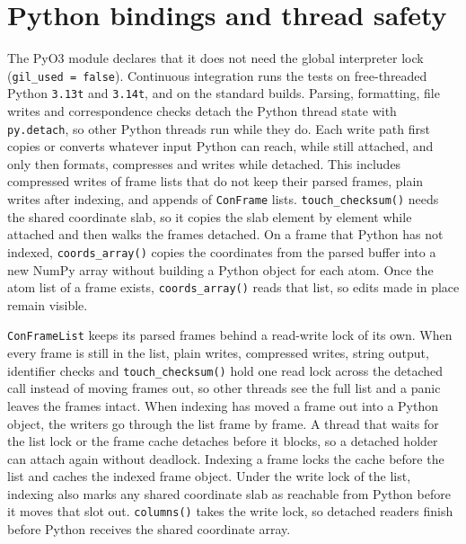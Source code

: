 \documentclass[preprint,12pt]{elsarticle}
\begin{document}


\FloatBarrier \section{Python bindings and thread safety}\label{sec:supp-threads}
The PyO3 module declares that it does not need the global interpreter lock (\texttt{gil\_used = false}).
Continuous integration runs the tests on free-threaded Python \texttt{3.13t} and \texttt{3.14t}, and on the standard builds.
Parsing, formatting, file writes and correspondence checks detach the Python thread state with \texttt{py.detach}, so other Python threads run while they do.
Each write path first copies or converts whatever input Python can reach, while still attached, and only then formats, compresses and writes while detached.
This includes compressed writes of frame lists that do not keep their parsed frames, plain writes after indexing, and appends of \texttt{ConFrame} lists.
\texttt{touch\_checksum()} needs the shared coordinate slab, so it copies the slab element by element while attached and then walks the frames detached.
On a frame that Python has not indexed, \texttt{coords\_array()} copies the coordinates from the parsed buffer into a new NumPy array without building a Python object for each atom.
Once the atom list of a frame exists, \texttt{coords\_array()} reads that list, so edits made in place remain visible.

\texttt{ConFrameList} keeps its parsed frames behind a read-write lock of its own.
When every frame is still in the list, plain writes, compressed writes, string output, identifier checks and \texttt{touch\_checksum()} hold one read lock across the detached call instead of moving frames out, so other threads see the full list and a panic leaves the frames intact.
When indexing has moved a frame out into a Python object, the writers go through the list frame by frame.
A thread that waits for the list lock or the frame cache detaches before it blocks, so a detached holder can attach again without deadlock.
Indexing a frame locks the cache before the list and caches the indexed frame object.
Under the write lock of the list, indexing also marks any shared coordinate slab as reachable from Python before it moves that slot out.
\texttt{columns()} takes the write lock, so detached readers finish before Python receives the shared coordinate array.
\end{document}
